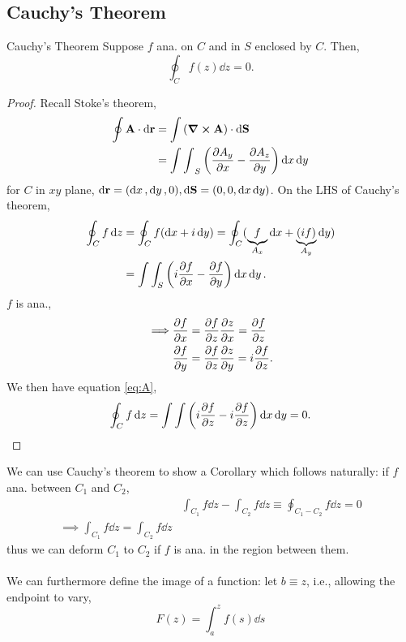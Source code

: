 \documentclass{book}
\begin{document}
\subsection{Cauchy's Theorem}
\begin{Theorems}{Cauchy's Theorem}{}
	Suppose $f$ ana. on $C$ and in $S$ enclosed by $C$. Then,
	\begin{equation}
		\oint_C f(z)\dd{z} = 0.
	\end{equation}
\end{Theorems}
\begin{proof}
	Recall Stoke's theorem,
	\begin{align}
		\oint\vb{A}\cdot{\dd{\vb{r}}} &= \int\left(\curl{\vb{A}}\right)\cdot\dd{\vb{S}} \\
		& = {\int\int}_S \left(\pdv{A_y}{x} - \pdv{A_z}{y}\right)\dd{x}\dd{y}
	\end{align}
	for $C$ in $xy$ plane, $\dd{\vb{r}} = (\dd{x},\dd{y}, 0), \dd{\vb{S}} = (0,0,\dd{x}\dd{y})$. On the LHS of Cauchy's theorem,
	\begin{align}
		\oint_C f\dd{z} & = \oint_C f(\dd{x} + i \dd{y}) = \oint_C(\underbrace{f}_{A_x}\dd{x} + \underbrace{(if)}_{A_y}\dd{y}) \\ 
		& = \int\int_S \left(i\pdv{f}{x} - \pdv{f}{y}\right)\dd{x}\dd{y}.\label{eq:A}
	\end{align}
	$f$ is ana.,
	\begin{align}
		\implies & \pdv{f}{x} = \pdv{f}{z}\pdv{z}{x} = \pdv{f}{z} \\
		& \pdv{f}{y} = \pdv{f}{z}\pdv{z}{y} = i\pdv{f}{z}.
	\end{align}
	We then have equation \eqref{eq:A},
	\begin{equation}
		\oint_Cf\dd{z} = \int\int\left(i\pdv{f}{z} - i\pdv{f}{z}\right)\dd{x}\dd{y} = 0.
	\end{equation}
\end{proof}
We can use Cauchy's theorem to show a Corollary which follows naturally: if $f$ ana. between $C_1$ and $C_2$,
\begin{align}
	&\int_{C_1}f\dd{z} - \int_{C_2}f\dd{z} \equiv \oint_{C_1-C_2}f\dd{z} = 0 \\
	\implies \int_{C_1}f\dd{z}=\int_{C_2}f\dd{z}
\end{align}
thus we can deform $C_1$ to $C_2$ if $f$ is ana. in the region between them. 
\\\\
We can furthermore define the image of a function: let $b \equiv z$, i.e., allowing the endpoint to vary,
\begin{equation}
	F(z) = \int_a^zf(s)\dd{s}
\end{equation}
\end{document}
